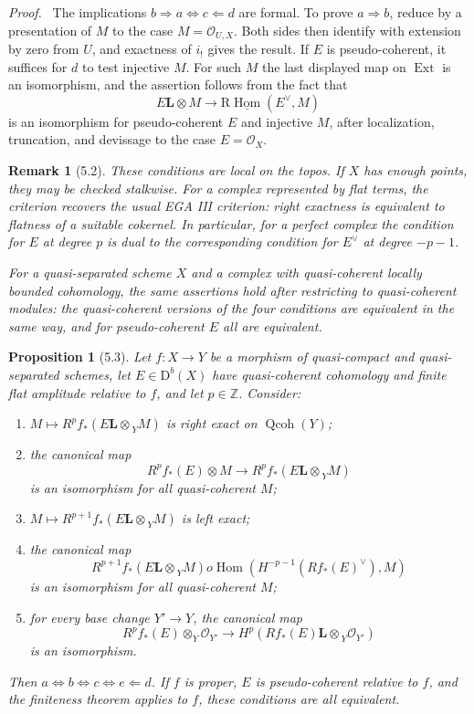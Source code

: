 \documentclass[13pt]{extarticle}
\newcommand{\ZZ}{\mathbb Z}
\newcommand{\cO}{\mathcal O}
\newcommand{\D}{\mathrm D}
\newcommand{\Qcoh}{\operatorname{Qcoh}}
\newcommand{\Hom}{\operatorname{Hom}}
\newcommand{\Ext}{\operatorname{Ext}}
\newcommand{\Ltens}{\mathbin{\mathbf L\!\otimes}}
\newcommand{\RHom}{\mathrm R\underline{\operatorname{Hom}}}
\newenvironment{prooftext}[1][Proof]{\par\noindent\emph{#1.}\ }{\par\medskip}
\newtheorem*{proposition*}{Proposition}
\newtheorem*{remark*}{Remark}
\begin{document}
\begin{prooftext}
The implications $b\Rightarrow a\Leftrightarrow c\Leftarrow d$ are formal. To prove $a\Rightarrow b$, reduce by a presentation of $M$ to the case $M=\cO_{U,X}$. Both sides then identify with extension by zero from $U$, and exactness of $i_!$ gives the result. If $E$ is pseudo-coherent, it suffices for $d$ to test injective $M$. For such $M$ the last displayed map on $\Ext$ is an isomorphism, and the assertion follows from the fact that
\[
E\Ltens M\to\RHom(E^\vee,M)
\]
is an isomorphism for pseudo-coherent $E$ and injective $M$, after localization, truncation, and devissage to the case $E=\cO_X$.
\end{prooftext}

\begin{remark*}[5.2]
These conditions are local on the topos. If $X$ has enough points, they may be checked stalkwise. For a complex represented by flat terms, the criterion recovers the usual EGA III criterion: right exactness is equivalent to flatness of a suitable cokernel. In particular, for a perfect complex the condition for $E$ at degree $p$ is dual to the corresponding condition for $E^\vee$ at degree $-p-1$.

For a quasi-separated scheme $X$ and a complex with quasi-coherent locally bounded cohomology, the same assertions hold after restricting to quasi-coherent modules: the quasi-coherent versions of the four conditions are equivalent in the same way, and for pseudo-coherent $E$ all are equivalent.
\end{remark*}

\begin{proposition*}[5.3]
Let $f:X\to Y$ be a morphism of quasi-compact and quasi-separated schemes, let $E\in\D^b(X)$ have quasi-coherent cohomology and finite flat amplitude relative to $f$, and let $p\in\ZZ$. Consider:
\begin{enumerate}[label=\alph*)]
\item $M\mapsto R^pf_*(E\Ltens_Y M)$ is right exact on $\Qcoh(Y)$;
\item the canonical map
\[
R^pf_*(E)\otimes M\to R^pf_*(E\Ltens_Y M)
\]
is an isomorphism for all quasi-coherent $M$;
\item $M\mapsto R^{p+1}f_*(E\Ltens_Y M)$ is left exact;
\item the canonical map
\[
R^{p+1}f_*(E\Ltens_Y M)	o\Hom(H^{-p-1}(Rf_*(E)^\vee),M)
\]
is an isomorphism for all quasi-coherent $M$;
\item for every base change $Y'\to Y$, the canonical map
\[
R^pf_*(E)\otimes_Y\cO_{Y'}\to H^p(Rf_*(E)\Ltens_Y\cO_{Y'})
\]
is an isomorphism.
\end{enumerate}
Then $a\Leftrightarrow b\Leftrightarrow c\Leftrightarrow e\Leftarrow d$. If $f$ is proper, $E$ is pseudo-coherent relative to $f$, and the finiteness theorem applies to $f$, these conditions are all equivalent.
\end{proposition*}
\end{document}
